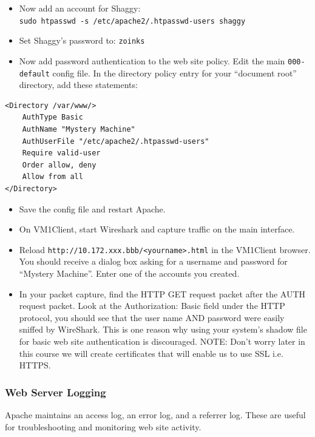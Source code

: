 \documentclass{article}
\begin{document}
\begin{itemize}

\item Now add an account for Shaggy:\\
{\tt sudo htpasswd -s /etc/apache2/.htpasswd-users shaggy}
\item Set Shaggy's password to: {\tt zoinks}

\item Now add password authentication to the web site policy. Edit the main {\tt 000-default} config file. In the directory policy entry for your ``document root'' directory, add these statements:
\end{itemize}
\begin{Verbatim}[frame=single]
<Directory /var/www/>
    AuthType Basic
    AuthName "Mystery Machine"
    AuthUserFile "/etc/apache2/.htpasswd-users"
    Require valid-user
    Order allow, deny
    Allow from all
</Directory>
\end{Verbatim}
\begin{itemize}
\item Save the config file and restart Apache. 
\item On VM1Client, start Wireshark and capture traffic on the main interface.  
\item Reload {\tt http://10.172.xxx.bbb/<yourname>.html} in the VM1Client browser. You should receive a dialog box asking for a username and password for ``Mystery Machine''. Enter one of the accounts you created. 
\item In your packet capture, find the HTTP GET request packet after the AUTH request packet. Look at the Authorization: Basic field under the HTTP protocol, you should see that the user name AND password were easily sniffed by WireShark. This is one reason why using your system's shadow file for basic web site authentication is discouraged. NOTE: Don't worry later in this course we will create certificates that will enable us to use SSL i.e. HTTPS.
\end{itemize}




\subsubsection{Web Server Logging}

Apache maintains an access log, an error log, and a referrer log. These are useful for troubleshooting and monitoring web site activity.
\end{document}
